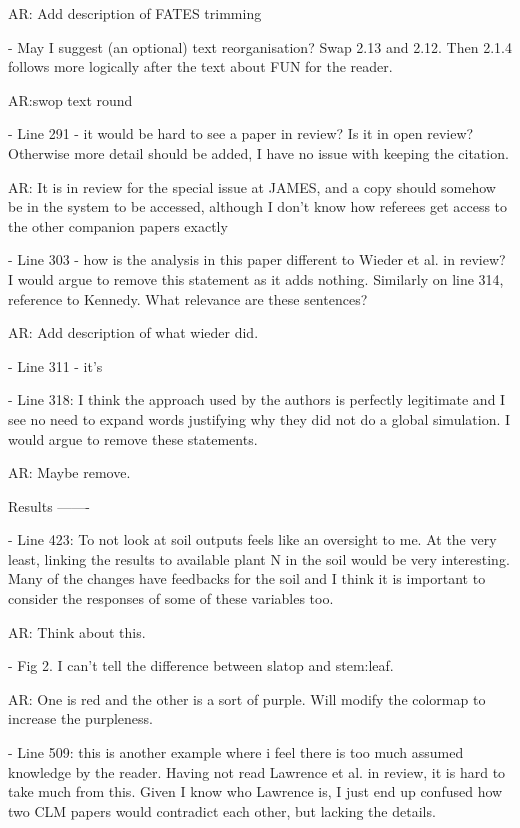 \documentclass{article}
\begin{document}
\textsf{AR: Add description of FATES trimming}

- May I suggest (an optional) text reorganisation? Swap 2.13 and 2.12. Then 2.1.4 follows more logically after the text about FUN for the reader. 

\textsf{AR:swop text round}

- Line 291 - it would be hard to see a paper in review? Is it in open review? Otherwise more detail should be added, I have no issue with keeping the citation. 

\textsf{AR: It is in review for the special issue at JAMES, and a copy should somehow be in the system to be accessed, although I don't know how referees get access to the other companion papers exactly}

- Line 303 - how is the analysis in this paper different to Wieder et al. in review? I would argue to remove this statement as it adds nothing. Similarly on line 314, reference to Kennedy. What relevance are these sentences? 

\textsf{AR: Add description of what wieder did.}

- Line 311 - it's 

- Line 318: I think the approach used by the authors is perfectly legitimate and I see no need to expand words justifying why they did not do a global simulation. I would argue to remove these statements. 

AR: \textsf{Maybe remove.}

Results 
------- 

- Line 423: To not look at soil outputs feels like an oversight to me. At the very least, linking the results to available plant N in the soil would be very interesting. Many of the changes have feedbacks for the soil and I think it is important to consider the responses of some of these variables too. 

\textsf{AR: Think about this.}

- Fig 2. I can't tell the difference between slatop and stem:leaf. 

\textsf{AR: One is red and the other is a sort of purple. Will modify the colormap to increase the purpleness.}


- Line 509: this is another example where i feel there is too much assumed knowledge by the reader. Having not read Lawrence et al. in review, it is hard to take much from this. Given I know who Lawrence is, I just end up confused how two CLM papers would contradict each other, but lacking the details. 
\end{document}
